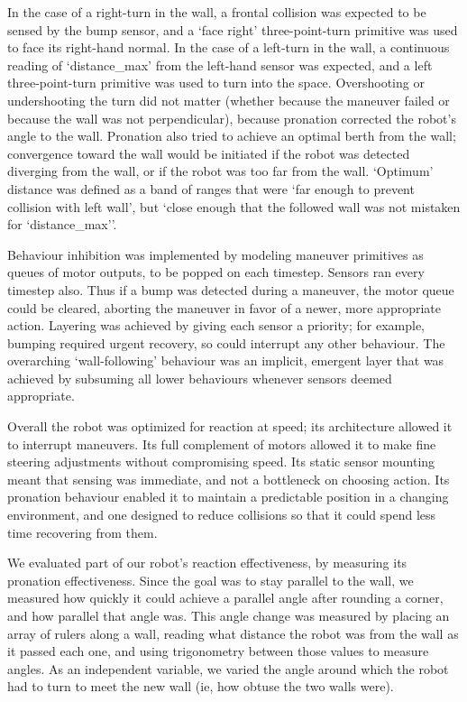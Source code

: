 \documentclass[a4paper,12pt]{article}
\begin{document}
In the case of a right-turn in the wall, a frontal collision was expected to be sensed by the bump sensor, and a `face right' three-point-turn primitive was used to face its right-hand normal. In the case of a left-turn in the wall, a continuous reading of `distance\_max' from the left-hand sensor was expected, and a left three-point-turn primitive was used to turn into the space. Overshooting or undershooting the turn did not matter (whether because the maneuver failed or because the wall was not perpendicular), because pronation corrected the robot's angle to the wall. Pronation also tried to achieve an optimal berth from the wall; convergence toward the wall would be initiated if the robot was detected diverging from the wall, or if the robot was too far from the wall. `Optimum' distance was defined as a band of ranges that were `far enough to prevent collision with left wall', but `close enough that the followed wall was not mistaken for `distance\_max''.

Behaviour inhibition was implemented by modeling maneuver primitives as queues of motor outputs, to be popped on each timestep. Sensors ran every timestep also. Thus if a bump was detected during a maneuver, the motor queue could be cleared, aborting the maneuver in favor of a newer, more appropriate action. Layering was achieved by giving each sensor a priority; for example, bumping required urgent recovery, so could interrupt any other behaviour. The overarching `wall-following' behaviour was an implicit, emergent layer that was achieved by subsuming all lower behaviours whenever sensors deemed appropriate.

Overall the robot was optimized for reaction at speed; its architecture allowed it to interrupt maneuvers. Its full complement of motors allowed it to make fine steering adjustments without compromising speed. Its static sensor mounting meant that sensing was immediate, and not a bottleneck on choosing action. Its pronation behaviour enabled it to maintain a predictable position in a changing environment, and one designed to reduce collisions so that it could spend less time recovering from them.

We evaluated part of our robot's reaction effectiveness, by measuring its pronation effectiveness. Since the goal was to stay parallel to the wall, we measured how quickly it could achieve a parallel angle after rounding a corner, and how parallel that angle was. This angle change was measured by placing an array of rulers along a wall, reading what distance the robot was from the wall as it passed each one, and using trigonometry between those values to measure angles. As an independent variable, we varied the angle around which the robot had to turn to meet the new wall (ie, how obtuse the two walls were).
\end{document}
